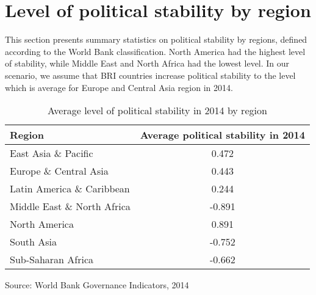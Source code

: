 \section{Level of political stability by region}

This section presents summary statistics on political stability by regions, defined according to the World Bank classification. North America had the highest level of stability, while Middle East and North Africa had the lowest level. In our scenario, we assume that BRI countries increase political stability to the level which is average for Europe and Central Asia region in 2014.

\begin{table}
    \centering
    \caption{Average level of political stability in 2014 by region}
    \begin{tabular}{l|c}
\hline
Region &	Average political stability in 2014 \\
\hline
East Asia \& Pacific &	0.472 \\
Europe \& Central Asia &	0.443 \\ 
Latin America \& Caribbean &	0.244 \\
Middle East \& North Africa &	-0.891 \\
North America &	0.891 \\
South Asia &	-0.752 \\
Sub-Saharan Africa &	-0.662 \\
\hline
    \end{tabular}
    
    \label{tab:ps2014}
Source: World Bank Governance Indicators, 2014
\end{table}